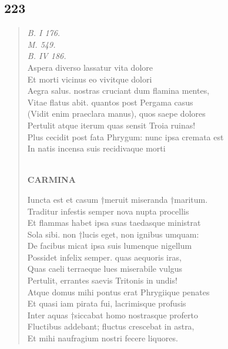 \documentclass[11pt, a4paper]{report}
\begin{document}
            \subsection*{223}
      \begin{verse}
      \textit{B. I 176.} \\ \textit{M. 549.} \\ \textit{B. IV 186.} \\ Aspera diverso lassatur vita dolore \\ Et morti vicinus eo vivitque dolori \\ Aegra salus. nostras cruciant dum flamina mentes, \\ Vitae flatus abit. quantos post Pergama casus \\ (Vidit enim praeclara manus), quos saepe dolores \\ Pertulit atque iterum quas sensit Troia ruinas! \\ Plus cecidit post fata Phrygum: nunc ipsa cremata est \\ In natis incensa suis recidivaque morti \\ 
        ﻿\pagebreak 
     \marginpar{[188]} \begin{center} \textbf{CARMINA} \end{center}Iuncta est et casum †meruit miseranda †maritum. \\ Traditur infestis semper nova nupta procellis \\ Et flammas habet ipsa suas taedasque ministrat \\ Sola sibi. non †lucis eget, non ignibus umquam: \\ De facibus micat ipsa suis lumenque nigellum \\ Possidet infelix semper. quas aequoris iras, \\ Quas caeli terraeque lues miserabile vulgus \\ Pertulit, errantes saevis Tritonis in undis! \\ Atque domus mihi pontus erat Phrygiique penates \\ Et quasi iam pirata fui, lacrimisque profusis \\ Inter aquas †siccabat homo nostrasque proferto \\ Fluctibus addebant; fluctus crescebat in astra, \\ Et mihi naufragium nostri fecere liquores. \\ 
      \end{verse}
  
\end{document}
